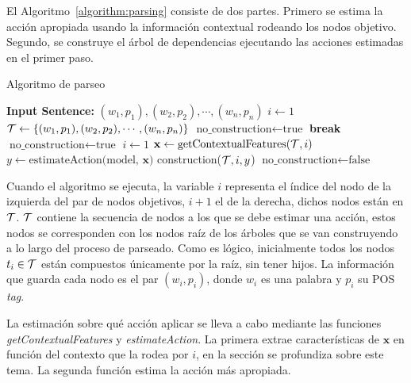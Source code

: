 El Algoritmo~\autoref{algorithm:parsing} consiste de dos partes. Primero se
estima la acción apropiada usando la información contextual rodeando los nodos
objetivo. Segundo, se construye el árbol de dependencias ejecutando las acciones
estimadas en el primer paso.
\begin{algorithm}[H]
  \caption{Algoritmo de parseo}
  \label{algorithm:parsing}

  
  \begin{algorithmic}[1] %
    \State \textbf{Input Sentence:} $(w_1, p_1),(w_2,p_2),\cdots,(w_n,p_n)$
    \Init
       \State $i\gets 1$
       \State ${\cal T}\gets \{(w_1, p_1),(w_2,p_2),\cdots,(w_n,p_n)\}$
       \State $\text{no\_construction}\gets \text{true}$
    \EndInit
    \Start
                \textbf{break}
             \EndIf
             \State $\text{no\_construction}\gets \text{true}$
             \State $i\gets 1$
          \Else
             \State $\mathbf{x}\gets \text{getContextualFeatures(${\cal T}, i$)} $
             \State $y\gets \text{estimateAction(model, $\mathbf{x}$)}$
             \State construction(${\cal T}, i, y$)
                $\text{no\_construction}\gets \text{false}$
             \EndIf
          \EndIf
       \EndWhile
    \EndStart
    \end{algorithmic}
\end{algorithm}
Cuando el algoritmo se ejecuta, la variable $i$ representa el índice del nodo de
la izquierda del par de nodos objetivos, $i + 1$ el de la derecha, dichos nodos
están en ${\cal T}$. ${\cal T}$ contiene la secuencia de nodos a los que se debe
estimar una acción, estos nodos se corresponden con los nodos raíz de los
árboles que se van construyendo a lo largo del proceso de parseado. Como es
lógico, inicialmente todos los nodos $t_i\in {\cal T}$ están compuestos
únicamente por la raíz, sin tener hijos. La información que guarda cada nodo es
el par $(w_i, p_i)$, donde $w_i$ es una palabra y $p_i$ su \ac{POS} \emph{tag}.

La estimación sobre qué acción aplicar se lleva a cabo mediante las funciones
\emph{getContextualFeatures} y \emph{estimateAction}. La primera extrae
características de $\mathbf{x}$ en función del contexto que la rodea por $i$, en
la sección  se profundiza sobre este tema. La
segunda función estima la acción más apropiada.

